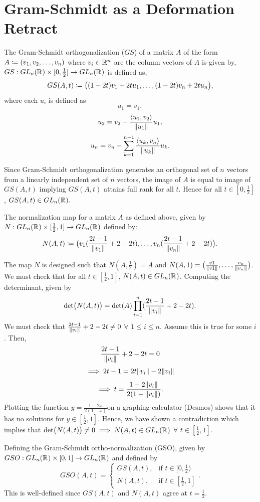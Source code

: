\section{Gram-Schmidt as a Deformation Retract}
\label{s:deformation_retract}
\begin{definition}
The Gram-Schmidt orthogonalization ($GS$) of a matrix $A$ of the form $A \Let (v_1, v_2, \ldots , v_n)$ where $v_i \in \R[n]$ are the column vectors of $A$ is given by,
$GS: GL_n(\R) \times [0, \frac{1}{2}] \mapsto GL_n(\R)$ is defined as,
$$GS(A, t) \Let \bigl((1-2t)v_1 + 2tu_1, \ldots, (1-2t)v_n + 2tu_n\bigr),$$ where each $u_i$ is defined as
$$u_1 = v_1,$$
$$u_2 = v_2 - \frac{\innerprod{u_1, v_2}}{\norm{u_1}}u_1,$$
$$u_n = v_n - \sum_{k=1}^{n-1}\frac{\innerprod{u_k, v_n}}{\norm{u_k}}u_k.$$
\end{definition}
Since Gram-Schmidt orthogonalization generates an orthogonal set of $n$ vectors from a linearly independent set of $n$ vectors, the image of $A$ is equal to image of $GS(A, t)$ implying $GS(A, t)$ attains full rank for all $t$. Hence for all $t \in [0, \frac{1}{2}]$, $GS(A,t) \in GL_n(\R).$ 
\begin{definition}
The normalization map for a matrix $A$ as defined above, given by $N: GL_n(\R) \times [\frac{1}{2}, 1] \mapsto GL_n(\R)$ defined by:
$$N(A,t) \Let \bigl(v_1(\frac{2t-1}{\norm{v_1}} + 2 - 2t), \ldots , v_n(\frac{2t-1}{\norm{v_n}} + 2 - 2t)\bigr).$$
\end{definition}
The map $N$ is designed such that $N(A,\frac{1}{2}) = A$ and $N(A, 1) = \bigl(\frac{v1}{\norm{v1}}, \ldots ,\frac{v_n}{\norm{v_n}}\bigr)$. We must check that for all $t \in [\frac{1}{2},1]$, $N(A,t) \in GL_n(\R)$. Computing the determinant, given by
$$\mathrm{det}\bigl(N(A,t)\bigr) = \mathrm{det}(A)\prod_{i=1}^{n}(\frac{2t-1}{\norm{v_i}} + 2 - 2t).$$
We must check that $\frac{2t-1}{\norm{v_i}} + 2 - 2t \neq 0$ $\forall$ $1\leq i \leq n$. Assume this is true for some $i$. Then,
$$\frac{2t-1}{\norm{v_i}} + 2 - 2t = 0$$
$$\implies 2t - 1 = 2t\norm{v_i} - 2\norm{v_i}$$
$$\implies t = \frac{1 - 2\norm{v_i}}{2(1 - \norm{v_i})}.$$
Plotting the function $y = \frac{1-2x}{2(1-x)}$on a graphing-calculator (Desmos) shows that it has no solutions for $y \in [\frac{1}{2}, 1]$. Hence, we have shown a contradiction which implies that $\mathrm{det}\bigl(N(A,t)\bigr) \neq 0 \implies N(A,t) \in GL_n(\R)$ $\forall$ $t \in [\frac{1}{2},1].$ 

\begin{definition}
Defining the Gram-Schmidt ortho-normalization (GSO), given by $GSO: GL_n(\R) \times [0,1] \mapsto GL_n(\R)$ and defined by
\[
    GSO(A,t) = 
\begin{cases}
    GS(A,t),& \text{if } t\in [0, \frac{1}{2})\\
    N(A,t),& \text{if } t\in [\frac{1}{2}, 1]
\end{cases}.
\]
This is well-defined since $GS(A,t)$ and $N(A,t)$ agree at $t=\frac{1}{2}$.
\end{definition}

